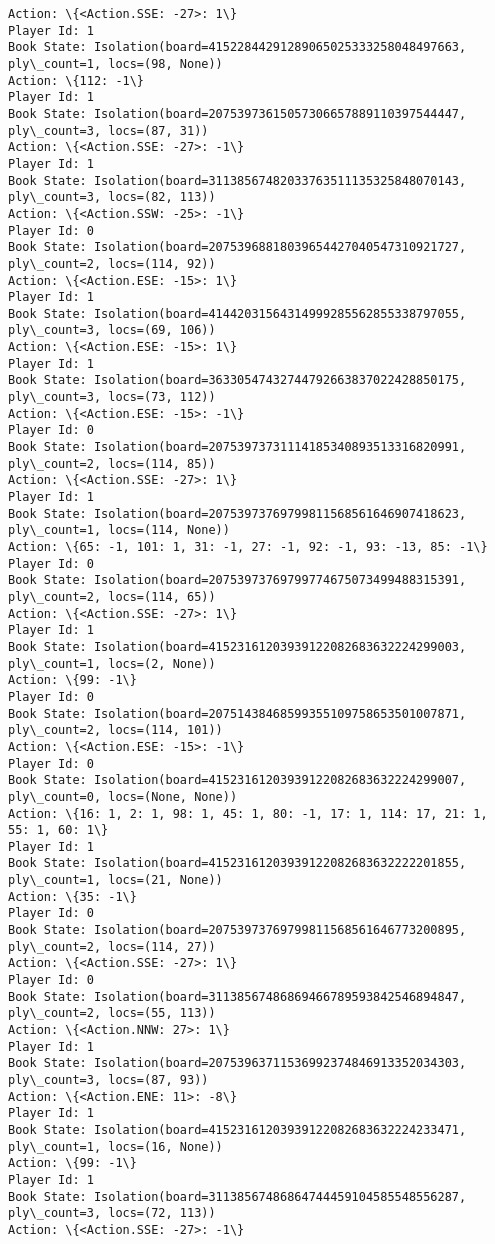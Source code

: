 \documentclass[11pt]{article}
\begin{document}
\begin{Verbatim}[commandchars=\\\{\}]
Action: \{<Action.SSE: -27>: 1\}
Player Id: 1
Book State: Isolation(board=41522844291289065025333258048497663, ply\_count=1, locs=(98, None))
Action: \{112: -1\}
Player Id: 1
Book State: Isolation(board=20753973615057306657889110397544447, ply\_count=3, locs=(87, 31))
Action: \{<Action.SSE: -27>: -1\}
Player Id: 1
Book State: Isolation(board=31138567482033763511135325848070143, ply\_count=3, locs=(82, 113))
Action: \{<Action.SSW: -25>: -1\}
Player Id: 0
Book State: Isolation(board=20753968818039654427040547310921727, ply\_count=2, locs=(114, 92))
Action: \{<Action.ESE: -15>: 1\}
Player Id: 1
Book State: Isolation(board=41442031564314999285562855338797055, ply\_count=3, locs=(69, 106))
Action: \{<Action.ESE: -15>: 1\}
Player Id: 1
Book State: Isolation(board=36330547432744792663837022428850175, ply\_count=3, locs=(73, 112))
Action: \{<Action.ESE: -15>: -1\}
Player Id: 0
Book State: Isolation(board=20753973731114185340893513316820991, ply\_count=2, locs=(114, 85))
Action: \{<Action.SSE: -27>: 1\}
Player Id: 1
Book State: Isolation(board=20753973769799811568561646907418623, ply\_count=1, locs=(114, None))
Action: \{65: -1, 101: 1, 31: -1, 27: -1, 92: -1, 93: -13, 85: -1\}
Player Id: 0
Book State: Isolation(board=20753973769799774675073499488315391, ply\_count=2, locs=(114, 65))
Action: \{<Action.SSE: -27>: 1\}
Player Id: 1
Book State: Isolation(board=41523161203939122082683632224299003, ply\_count=1, locs=(2, None))
Action: \{99: -1\}
Player Id: 0
Book State: Isolation(board=20751438468599355109758653501007871, ply\_count=2, locs=(114, 101))
Action: \{<Action.ESE: -15>: -1\}
Player Id: 0
Book State: Isolation(board=41523161203939122082683632224299007, ply\_count=0, locs=(None, None))
Action: \{16: 1, 2: 1, 98: 1, 45: 1, 80: -1, 17: 1, 114: 17, 21: 1, 55: 1, 60: 1\}
Player Id: 1
Book State: Isolation(board=41523161203939122082683632222201855, ply\_count=1, locs=(21, None))
Action: \{35: -1\}
Player Id: 0
Book State: Isolation(board=20753973769799811568561646773200895, ply\_count=2, locs=(114, 27))
Action: \{<Action.SSE: -27>: 1\}
Player Id: 0
Book State: Isolation(board=31138567486869466789593842546894847, ply\_count=2, locs=(55, 113))
Action: \{<Action.NNW: 27>: 1\}
Player Id: 1
Book State: Isolation(board=20753963711536992374846913352034303, ply\_count=3, locs=(87, 93))
Action: \{<Action.ENE: 11>: -8\}
Player Id: 1
Book State: Isolation(board=41523161203939122082683632224233471, ply\_count=1, locs=(16, None))
Action: \{99: -1\}
Player Id: 1
Book State: Isolation(board=31138567486864744459104585548556287, ply\_count=3, locs=(72, 113))
Action: \{<Action.SSE: -27>: -1\}

\end{Verbatim}
\end{document}
